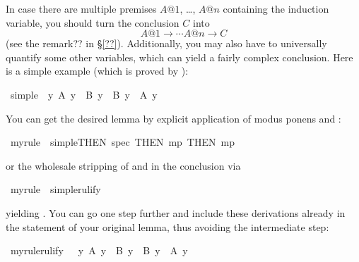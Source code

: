 \begin{isabelle}
\begin{isamarkuptext}
In case there are multiple premises $A@1$, \dots, $A@n$ containing the
induction variable, you should turn the conclusion $C$ into
\[ A@1 \longrightarrow \cdots A@n \longrightarrow C \]
(see the remark?? in \S\ref{??}).
Additionally, you may also have to universally quantify some other variables,
which can yield a fairly complex conclusion.
Here is a simple example (which is proved by ):%
\end{isamarkuptext}%
\ simple{\isacharcolon}\ {\isachardoublequote}{\isasymforall}\ y{\isachardot}\ A\ y\ {\isasymlongrightarrow}\ B\ y\ {\isasymlongrightarrow}\ B\ y\ {\isacharampersand}\ A\ y{\isachardoublequote}%
\begin{isamarkuptext}%
\noindent
You can get the desired lemma by explicit
application of modus ponens and :%
\end{isamarkuptext}%
\ myrule\ {\isacharequal}\ simple{\isacharbrackleft}THEN\ spec{\isacharcomma}\ THEN\ mp{\isacharcomma}\ THEN\ mp{\isacharbrackright}%
\begin{isamarkuptext}%
\noindent
or the wholesale stripping of \isa{\isasymforall} and
\isa{\isasymlongrightarrow} in the conclusion via %
\end{isamarkuptext}%
\ myrule\ {\isacharequal}\ simple{\isacharbrackleft}rulify{\isacharbrackright}%
\begin{isamarkuptext}%
\noindent
yielding .
You can go one step further and include these derivations already in the
statement of your original lemma, thus avoiding the intermediate step:%
\end{isamarkuptext}%
\ myrule{\isacharbrackleft}rulify{\isacharbrackright}{\isacharcolon}\ \ {\isachardoublequote}{\isasymforall}\ y{\isachardot}\ A\ y\ {\isasymlongrightarrow}\ B\ y\ {\isasymlongrightarrow}\ B\ y\ {\isacharampersand}\ A\ y{\isachardoublequote}%
\begin{isamarkuptext}%
\bigskip


\end{isamarkuptext}
\end{isabelle}
